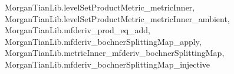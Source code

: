 \begin{proposition}
{  MorganTianLib.levelSetProductMetric_metricInner,
  MorganTianLib.levelSetProductMetric_metricInner_ambient,
  MorganTianLib.mfderiv_prod_eq_add,
  MorganTianLib.mfderiv_bochnerSplittingMap_apply,
  MorganTianLib.metricInner_mfderiv_bochnerSplittingMap,
  MorganTianLib.mfderiv_bochnerSplittingMap_injective}

\end{proposition}
